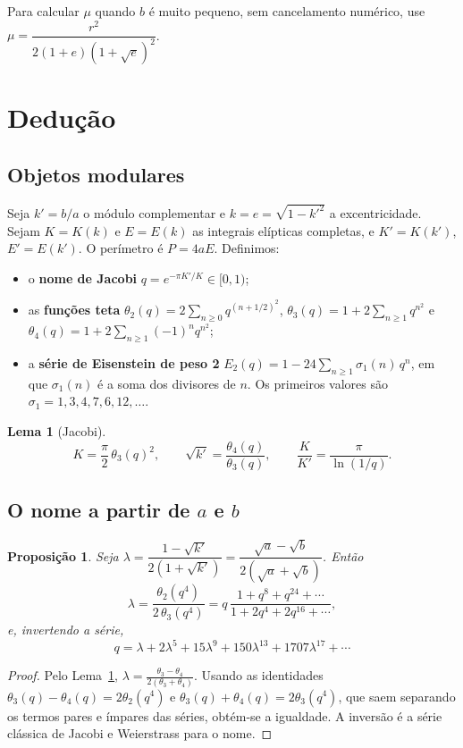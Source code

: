 \documentclass[11pt,a4paper]{article}
\newtheorem{proposicao}[teorema]{Proposição}
\newtheorem{lema}[teorema]{Lema}
\theoremstyle{remark}
\begin{document}
Para calcular $\mu$ quando $b$ é muito pequeno, sem cancelamento numérico, use
$\mu=\dfrac{r^2}{2(1+e)(1+\sqrt e)^2}$.

\section{Dedução}

\subsection{Objetos modulares}

Seja $k'=b/a$ o módulo complementar e $k=e=\sqrt{1-k'^2}$ a excentricidade. Sejam
$K=K(k)$ e $E=E(k)$ as integrais elípticas completas, e $K'=K(k')$, $E'=E(k')$. O
perímetro é $P=4aE$. Definimos:
\begin{itemize}
\item o \textbf{nome de Jacobi} $q=e^{-\pi K'/K}\in[0,1)$;
\item as \textbf{funções teta}
$\theta_2(q)=2\sum_{n\ge0}q^{(n+1/2)^2}$,
$\theta_3(q)=1+2\sum_{n\ge1}q^{n^2}$ e
$\theta_4(q)=1+2\sum_{n\ge1}(-1)^nq^{n^2}$;
\item a \textbf{série de Eisenstein de peso 2}
$E_2(q)=1-24\sum_{n\ge1}\sigma_1(n)\,q^n$, em que $\sigma_1(n)$ é a soma dos
divisores de $n$. Os primeiros valores são $\sigma_1=1,3,4,7,6,12,\dots$.
\end{itemize}

\begin{lema}[Jacobi]\label{lema:jacobi}
\[
K=\frac\pi2\,\theta_3(q)^2,\qquad \sqrt{k'}=\frac{\theta_4(q)}{\theta_3(q)},\qquad
\frac{K}{K'}=\frac{\pi}{\ln(1/q)} .
\]
\end{lema}

\subsection{O nome a partir de \texorpdfstring{$a$}{a} e \texorpdfstring{$b$}{b}}

\begin{proposicao}\label{prop:nome}
Seja $\lambda=\dfrac{1-\sqrt{k'}}{2(1+\sqrt{k'})}=\dfrac{\sqrt a-\sqrt b}{2(\sqrt a+\sqrt b)}$. Então
\[
\lambda=\frac{\theta_2(q^4)}{2\,\theta_3(q^4)}
=q\,\frac{1+q^8+q^{24}+\cdots}{1+2q^4+2q^{16}+\cdots},
\]
e, invertendo a série,
\[
q=\lambda+2\lambda^5+15\lambda^9+150\lambda^{13}+1707\lambda^{17}+\cdots
\]
\end{proposicao}
\begin{proof}
Pelo Lema~\ref{lema:jacobi},
$\lambda=\frac{\theta_3-\theta_4}{2(\theta_3+\theta_4)}$. Usando as identidades
$\theta_3(q)-\theta_4(q)=2\theta_2(q^4)$ e $\theta_3(q)+\theta_4(q)=2\theta_3(q^4)$, que saem
separando os termos pares e ímpares das séries, obtém-se a igualdade. A inversão é a série
clássica de Jacobi e Weierstrass para o nome.
\end{proof}
\end{document}
